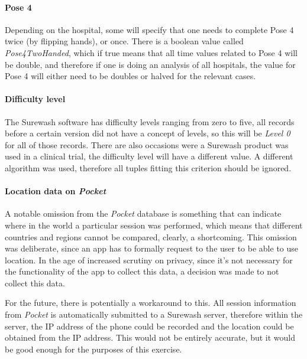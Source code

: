             \paragraph{Pose 4} Depending on the hospital, some will specify that one needs to complete Pose 4 twice (by flipping hands), or once. There is a boolean value called {\slshape Pose4TwoHanded}, which if true means that all time values related to Pose 4 will be double, and therefore if one is doing an analysis of all hospitals, the value for Pose 4 will either need to be doubles or halved for the relevant cases.
            \paragraph{Difficulty level} The Surewash software has difficulty levels ranging from zero to five, all records before a certain version did not have a concept of levels, so this will be {\slshape Level 0} for all of those records. There are also occasions were a Surewash product was used in a clinical trial, the difficulty level will have a different value. A different algorithm was used, therefore all tuples fitting this criterion should be ignored.
            \paragraph{Location data on {\slshape Pocket}} A notable omission from the {\slshape Pocket} database is something that can indicate where in the world a particular session was performed, which means that different countries and regions cannot be compared, clearly, a shortcoming. This omission was deliberate, since an app has to formally request to the user to be able to use location. In the age of increased scrutiny on privacy, since it's not necessary for the functionality of the app to collect this data, a decision was made to not collect this data.

            For the future, there is potentially a workaround to this. All session information from {\slshape Pocket} is automatically submitted to a Surewash server, therefore within the server, the IP address of the phone could be recorded and the location could be obtained from the IP address. This would not be entirely accurate, but it would be good enough for the purposes of this exercise.
